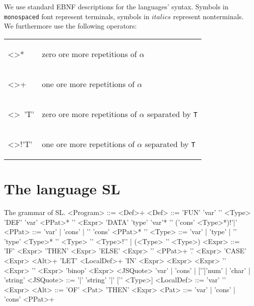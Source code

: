 \documentclass{article}
\begin{document}
We use standard EBNF descriptions for the languages' syntax. Symbols
in \texttt{monospaced} font represent terminals, symbols in
$\mathit{italics}$ represent nonterminals. We furthermore use the
following operators:
\begin{center}
  \begin{tabular}{ll}
    \begin{grammar}<\alpha>*\end{grammar} &
    zero ore more repetitions of $\alpha$ \\
    \begin{grammar}<\alpha>+\end{grammar} &
    one ore more repetitions of $\alpha$ \\
    \begin{grammar}<\alpha>~'T'\end{grammar} &
    zero ore more repetitions of $\alpha$ separated by \texttt{T} \\
    \begin{grammar}<\alpha>!'T'\end{grammar} &
    one ore more repetitions of $\alpha$ separated by \texttt{T}
  \end{tabular}
\end{center}


\section{The language SL}

\renewcommand{\arraystretch}{1.2}

\begin{grammarfigure}[grm:sl]{The grammar of SL.}
  <Program> ::= <Def>+
  <Def> ::= 'FUN' 'var' '\colon' <Type>
  \alt 'DEF' 'var' <PPat>* '\eq' <Expr>
  \alt 'DATA' 'type' 'var'* '\eq' ('cons' <Type>*)!'\bar'
  <PPat> ::= 'var' | 'cons' | '\open' 'cons' <PPat>* '\close'
  <Type> ::= 'var' | 'type' | '\open' 'type' <Type>* '\close'
  \alt <Type> '\arrow' <Type>!'\arrow' | (<Type> '\arrow' <Type>)
  <Expr> ::= 'IF' <Expr> 'THEN' <Expr> 'ELSE' <Expr>
  \alt '\lam' <PPat>+ '.' <Expr>
  \alt 'CASE' <Expr> <Alt>+
  \alt 'LET' <LocalDef>+ 'IN' <Expr>
  \alt <Expr> <Expr>
  \alt '\open' <Expr> '\close'
  \alt <Expr> 'binop' <Expr>
  \alt <JSQuote>
  \alt 'var' | 'cons' | ['\subint']'num' | 'char' | 'string'
  <JSQuote> ::= '\bropen\bar' 'string' '\bar\brclose' ['\colon' <Type>]
  <LocalDef> ::= 'var' '\eq' <Expr>
  <Alt> ::= 'OF' <Pat> 'THEN' <Expr>
  <Pat> ::= 'var' | 'cons' | 'cons' <PPat>+
\end{grammarfigure}
\end{document}
